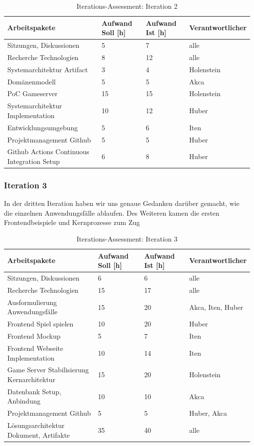\documentclass[11pt,ngerman]{article}
\begin{document}
    \begin{table}[H]
    	\caption{Iterations-Assessment: Iteration 2}
    	\begin{tabularx}{\textwidth}{X l l l}
    		\toprule
    		Arbeitspakete & Aufwand Soll [h] & Aufwand Ist [h] & Verantwortlicher \\
    		\toprule
    		Sitzungen, Diskussionen & 5 & 7 & alle \\
    		Recherche Technologien & 8 & 12 & alle \\
    		Systemarchitektur Artifact & 3 & 4 & Holenstein \\
    		Domänenmodell & 5 & 5 & Akca \\
    		PoC Gameserver & 15 & 15 & Holenstein \\
    		Systemarchitektur Implementation & 10 & 12 & Huber \\
    		Entwicklungsumgebung & 5 & 6 & Iten \\
    		Projektmanagement Github & 5 & 5 & Huber \\
    		Github Actions Continuous Integration Setup & 6 & 8 & Huber \\
    		\bottomrule
    	\end{tabularx}
    	\label{tab:Iterations-Assessment: Iteration 2}
    \end{table}

    \subsubsection{Iteration 3}

    In der dritten Iteration haben wir uns genaue Gedanken darüber gemacht, wie die einzelnen Anwendungsfälle ablaufen. Des Weiteren kamen die ersten Frontendbeispiele und Kernprozesse zum Zug

    \begin{table}[H]
    	\caption{Iterations-Assessment: Iteration 3}
    	\begin{tabularx}{\textwidth}{X l l l}
    		\toprule
    		Arbeitspakete & Aufwand Soll [h] & Aufwand Ist [h] & Verantwortlicher \\
    		\toprule
    		Sitzungen, Diskussionen & 6 & 6 & alle \\
    		Recherche Technologien & 15 & 17 & alle \\
    		Ausformulierung Anwendungsfälle & 15 & 20 & Akca, Iten, Huber \\
    		Frontend Spiel spielen & 10 & 20 & Huber \\
    		Frontend Mockup & 5 & 7 & Iten \\
    		Frontend Webseite Implementation & 10 & 14 & Iten \\
    		Game Server Stabilisierung Kernarchitektur & 15 & 20 & Holenstein \\
    		Datenbank Setup, Anbindung & 10 & 10 & Akca \\
    		Projektmanagement Github & 5 & 5 & Huber, Akca \\
    		Lösungsarchitektur Dokument, Artifakte & 35 & 40 & alle \\
    		\bottomrule
    	\end{tabularx}
    	\label{tab:Iterations-Assessment: Iteration 3}
    \end{table}
\end{document}
